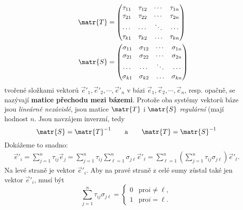      \begin{gather*}
        \begin{aligned}
          \matr{T} &= 
            \begin{pmatrix}
              \tau_{11} & \tau_{12} & \cdots & \tau_{1n}    \\
              \tau_{21} & \tau_{22} & \cdots & \tau_{2n}    \\
              \cdots    & \cdots    & \ddots & \cdots       \\
              \tau_{k1} & \tau_{k2} & \ldots & \tau_{kn}
            \end{pmatrix}           \\
          \qquad \matr{S} &=
          \begin{pmatrix}
            \sigma_{11} & \sigma_{12} & \cdots & \sigma_{1n}    \\
            \sigma_{21} & \sigma_{22} & \cdots & \sigma_{2n}    \\
            \cdots      & \cdots      & \ddots & \cdots         \\
            \sigma_{k1} & \sigma_{k2} & \ldots & \sigma_{kn}
          \end{pmatrix}
        \end{aligned}  
      \end{gather*}    
      tvořené složkami vektorů \(\vec{e}'_1, \vec{e}'_2, \cdots, \vec{e}'_n\) v bázi \(\vec{e}_1,
      \vec{e}_2, \cdots, \vec{e}_n\), resp. opačně, se nazývají \textbf{matice přechodu mezi
      bázemi}. Protože oba systémy vektorů báze jsou \emph{lineárně nezávislé}, jsou matice
      \(\matr{T}\) i \(\matr{S}\) \emph{regulární} (mají hodnost \(n\). Jsou navzájem inverzní, tedy
      \begin{equation*}
        \matr{S} = \matr{T}^{-1} \qquad \text{a} \qquad \matr{T} = \matr{S}^{-1}
      \end{equation*}
      Dokážeme to snadno:
      \begin{gather*}
        \vec{e}'_i = \sum_{j=1}^n\tau_{ij}\vec{e}_j 
                   = \sum_{j=1}^n\tau_{ij}\sum_{\ell=1}^n\sigma_{j\ell}\vec{e}'_\ell
                   = \sum_{\ell=1}^n\left(\sum_{j=1}^n\tau_{ij}\sigma_{j\ell}\right)\vec{e}'_\ell.
      \end{gather*} 
      Na levé straně je vektor \(\vec{e}'_i\). Aby na pravé straně z celé sumy zůstal také jen
      vektor \(\vec{e}'_i\), musí být
      \begin{equation*}
        \sum_{j=1}^n\tau_{ij}\sigma_{j\ell} = 
        \begin{cases}
          0 & \text{pro} i \neq \ell, \\
          1 & \text{pro} i = \ell.
        \end{cases}
      \end{equation*}
